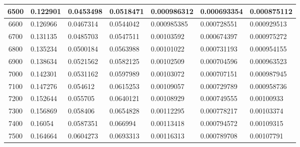 \documentclass[11pt,spanish]{article} %
\begin{document}
\begin{center}
\begin{longtable}{|c|l|l|l|l|l|l|}
6500 & 0.122901                     & 0.0453498                      & 0.0518471                      & 0.000986312                    & 0.000693354                    & 0.000875112                   \\ \hline
6600 & 0.126966                     & 0.0467314                      & 0.0544042                      & 0.000985385                    & 0.000728551                    & 0.000929513                   \\ \hline
6700 & 0.131135                     & 0.0485703                      & 0.0547511                      & 0.00103592                     & 0.000674397                    & 0.000975272                   \\ \hline
6800 & 0.135234                     & 0.0500184                      & 0.0563988                      & 0.00101022                     & 0.000731193                    & 0.000954155                   \\ \hline
6900 & 0.138634                     & 0.0521562                      & 0.0582125                      & 0.00102509                     & 0.000704596                    & 0.000963523                   \\ \hline
7000 & 0.142301                     & 0.0531162                      & 0.0597989                      & 0.00103072                     & 0.000707151                    & 0.000987945                   \\ \hline
7100 & 0.147276                     & 0.054612                       & 0.0615253                      & 0.00109057                     & 0.000729789                    & 0.000958736                   \\ \hline
7200 & 0.152644                     & 0.055705                       & 0.0640121                      & 0.00108929                     & 0.000749555                    & 0.00100933                    \\ \hline
7300 & 0.156869                     & 0.058406                       & 0.0654828                      & 0.00112295                     & 0.000778217                    & 0.00103374                    \\ \hline
7400 & 0.16054                      & 0.0587351                      & 0.066994                       & 0.00113418                     & 0.000794572                    & 0.00109315                    \\ \hline
7500 & 0.164664                     & 0.0604273                      & 0.0693313                      & 0.00116313                     & 0.000789708                    & 0.00107791                    \\ \hline

\end{longtable}
\end{center}
\end{document}
